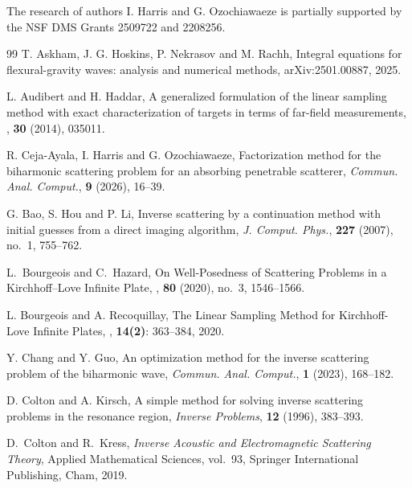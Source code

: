 \documentclass{article}
\begin{document}
 The research of authors I. Harris and G. Ozochiawaeze is partially supported by the NSF DMS Grants 2509722 and 2208256. \\

\begin{thebibliography}{99}
T. Askham, J. G. Hoskins, P. Nekrasov and M. Rachh,
Integral equations for flexural-gravity waves: analysis and numerical methods, arXiv:2501.00887, 2025.

L. Audibert and H. Haddar,
A generalized formulation of the linear sampling method with exact characterization of targets in terms of far-field measurements,
, {\bf 30} (2014), 035011.

R. Ceja-Ayala, I. Harris and G. Ozochiawaeze,
Factorization method for the biharmonic scattering problem for an absorbing penetrable scatterer,
\textit{Commun. Anal. Comput.}, \textbf{9} (2026), 16--39.

G. Bao, S. Hou and P. Li,
Inverse scattering by a continuation method with initial guesses from a direct imaging algorithm,
\textit{J. Comput. Phys.}, \textbf{227} (2007), no.~1, 755--762.

L.~Bourgeois and C.~Hazard,
On Well-Posedness of Scattering Problems in a Kirchhoff--Love Infinite Plate,
, \textbf{80} (2020), no.~3, 1546--1566.

L. Bourgeois and A. Recoquillay,
The Linear Sampling Method for Kirchhoff-Love Infinite Plates,
, {\bf 14(2)}: 363--384, 2020.

Y. Chang and Y. Guo,
An optimization method for the inverse scattering problem of the biharmonic wave,
\textit{Commun. Anal. Comput.}, \textbf{1} (2023), 168--182.

D. Colton and A. Kirsch,
A simple method for solving inverse scattering problems in the resonance region,
\textit{Inverse Problems}, \textbf{12} (1996), 383--393.

D.~Colton and R.~Kress,
\emph{Inverse Acoustic and Electromagnetic Scattering Theory},
Applied Mathematical Sciences, vol.~93,
Springer International Publishing, Cham, 2019.


\end{thebibliography}
\end{document}
